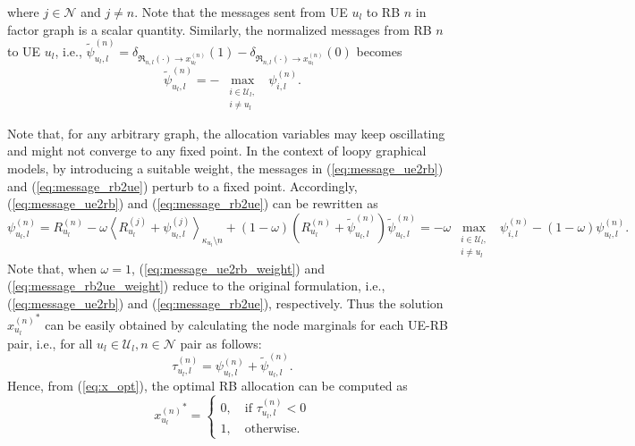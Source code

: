 \documentclass[twocolumn,10pt]{IEEEtran}
\begin{document}
where $j \in \mathcal{N}$ and $j \neq n$.  Note that the messages sent from UE $u_l$ to RB $n$ in factor graph is a scalar quantity. Similarly, the normalized messages from RB $n$ to UE $u_l$, i.e., $\tilde{\psi}_{u_l, l}^{(n)} = \delta_{\mathfrak{R}_{n,l}(\cdot) \rightarrow x_{u_l}^{(n)}} \left( 1 \right) - \delta_{\mathfrak{R}_{n,l}(\cdot) \rightarrow x_{u_l}^{(n)}} \left( 0 \right)$ becomes \cite{mp-twireless}
\begin{equation} \label{eq:message_rb2ue}
\tilde{\psi}_{u_l, l}^{(n)} = - ~\underset{\substack{i \in \mathcal{U}_l, \\  i \neq u_l}}{\operatorname \max} ~~ \psi_{i, l}^{(n)}.
\end{equation} 

Note that, for any arbitrary graph, the allocation variables may keep oscillating and might not converge to any fixed point. In the context of loopy graphical models, by introducing a suitable weight, the messages in (\ref{eq:message_ue2rb}) and (\ref{eq:message_rb2ue}) perturb to a fixed point. Accordingly, (\ref{eq:message_ue2rb}) and (\ref{eq:message_rb2ue}) can be rewritten as \cite{min-sum-mp}
\begin{subequations}
\begin{equation} \label{eq:message_ue2rb_weight}
  \psi_{u_l, l}^{(n)} = R_{u_l}^{(n)} - \omega \left\langle R_{u_l}^{(j)} + \psi_{u_l, l}^{(j)} \right\rangle_{\kappa_{u_l} \setminus n} + (1 - \omega) \left( R_{u_l}^{(n)} + \tilde{\psi}_{u_l, l}^{(n)} \right) 
\end{equation}    
\begin{equation} \label{eq:message_rb2ue_weight}
\tilde{\psi}_{u_l, l}^{(n)} = - \omega ~\underset{\substack{i \in \mathcal{U}_l, \\  i \neq u_l}}{\operatorname \max} ~~ \psi_{i, l}^{(n)} - (1 - \omega) \psi_{u_l, l}^{(n)}.
\end{equation}
\end{subequations}
Note that, when $\omega =1$, (\ref{eq:message_ue2rb_weight}) and (\ref{eq:message_rb2ue_weight}) reduce to the original formulation, i.e., (\ref{eq:message_ue2rb}) and (\ref{eq:message_rb2ue}), respectively. Thus the solution ${x_{u_l}^{(n)}}^*$ can be easily obtained by calculating the node marginals for each UE-RB pair, i.e., for all $u_l \in \mathcal{U}_l, n \in \mathcal{N}$ pair as follows:
\begin{equation}
\tau_{u_l, l}^{(n)} =  \psi_{u_l, l}^{(n)} + \tilde{\psi}_{u_l, l}^{(n)}.
\end{equation}
Hence, from (\ref{eq:x_opt}), the optimal RB allocation can be computed as
\begin{equation} \label{eq:rb_alloc_mp}
{x_{u_l}^{(n)}}^*  = \begin{cases}
 0, \quad  \text{if $\tau_{u_l, l}^{(n)} < 0$} \\
 1, \quad \text{otherwise.}
\end{cases}
\end{equation}
\end{document}
